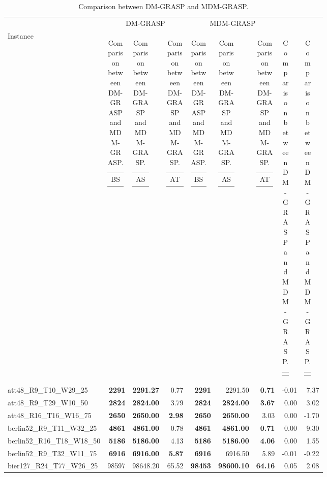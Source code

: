 \documentclass{singlecol-new}
\begin{document}
\begin{scriptsize}
	\begin{longtable}{lrrrrrrrr}
		\caption{Comparison between DM-GRASP and MDM-GRASP.}
		\label{tab:mdm-grasp}\\
		\hline
		& \multicolumn{3}{c}{DM-GRASP} & \multicolumn{3}{c}{MDM-GRASP} \\
		\cline{2-9}
		Instance & \begin{tabular}[c]{@{}l@{}}BS\end{tabular} & \begin{tabular}[c]{@{}l@{}}AS\end{tabular} & \begin{tabular}[r]{@{}l@{}}AT\end{tabular} & \begin{tabular}[r]{@{}l@{}}BS\end{tabular} & \begin{tabular}[c]{@{}l@{}}AS\end{tabular} & \begin{tabular}[r]{@{}l@{}}AT\end{tabular} & \begin{tabular}[c]{@{}l@{}}$Dif_{ms}$\end{tabular} & \begin{tabular}[c]{@{}l@{}}$Dif_{T}$\end{tabular} \\
		\hline
		\endhead
		att48\_R9\_T10\_W29\_25 & \textbf{2291} & \textbf{2291.27} & 0.77 & \textbf{2291} & 2291.50 & \textbf{0.71} & -0.01 & 7.37 \\
		att48\_R9\_T29\_W10\_50 & \textbf{2824} & \textbf{2824.00} & 3.79 & \textbf{2824} & \textbf{2824.00} & \textbf{3.67} & 0.00 & 3.02 \\
		att48\_R16\_T16\_W16\_75 & \textbf{2650} & \textbf{2650.00} & \textbf{2.98} & \textbf{2650} & \textbf{2650.00} & 3.03 & 0.00 & -1.70 \\
		berlin52\_R9\_T11\_W32\_25 & \textbf{4861} & \textbf{4861.00} & 0.78 & \textbf{4861} & \textbf{4861.00} & \textbf{0.71} & 0.00 & 9.30 \\
		berlin52\_R16\_T18\_W18\_50 & \textbf{5186} & \textbf{5186.00} & 4.13 & \textbf{5186} & \textbf{5186.00} & \textbf{4.06} & 0.00 & 1.55 \\
		berlin52\_R9\_T32\_W11\_75 & \textbf{6916} & \textbf{6916.00} & \textbf{5.87} & \textbf{6916} & 6916.50 & 5.89 & -0.01 & -0.22 \\
		bier127\_R24\_T77\_W26\_25 & 98597 & 98648.20 & 65.52 & \textbf{98453} & \textbf{98600.10} & \textbf{64.16} & 0.05 & 2.08 \\

\end{longtable}
\end{scriptsize}
\end{document}
